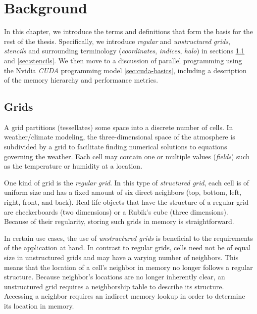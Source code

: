 \chapter{Background}                                    \label{sec:foundations}

In this chapter, we introduce the terms and definitions that form the basis for the rest of the thesis. Specifically, we introduce \emph{regular} and \emph{unstructured grids}, \emph{stencils} and surrounding terminology (\emph{coordinates}, \emph{indices}, \emph{halo}) in sections \ref{sec:grids} and \ref{sec:stencils}. We then move to a discussion of parallel programming using the Nvidia \emph{CUDA} programming model \ref{sec:cuda-basics}, including a description of the memory hierarchy and performance metrics.

\section{Grids}                                            \label{sec:grids}

A grid partitions (tessellates) some space into a discrete number of cells. In weather/climate modeling, the three-dimensional space of the atmosphere is subdivided by a grid to facilitate finding numerical solutions to equations governing the weather. Each cell may contain one or multiple values (\emph{fields}) such as the temperature or humidity at a location.

One kind of grid is the \emph{regular grid}. In this type of \emph{structured grid}, each cell is of uniform size and has a fixed amount of six direct neighbors (top, bottom, left, right, front, and back). Real-life objects that have the structure of a regular grid are checkerboards (two dimensions) or a Rubik's cube (three dimensions). Because of their regularity, storing such grids in memory is straightforward.

In certain use cases, the use of \emph{unstructured grids} is beneficial to the requirements of the application at hand. In contrast to regular grids, cells need not be of equal size in unstructured grids and may have a varying number of neighbors. This means that the location of a cell's neighbor in memory no longer follows a regular structure. Because neighbor's locations are no longer inherently clear, an unstructured grid requires a neighborship table to describe its structure. Accessing a neighbor requires an indirect memory lookup in order to determine its location in memory.

